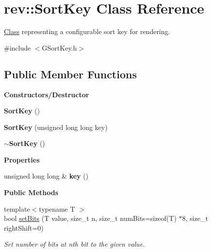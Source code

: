 \hypertarget{classrev_1_1_sort_key}{}\section{rev\+::Sort\+Key Class Reference}
\label{classrev_1_1_sort_key}


\mbox{\hyperlink{struct_class}{Class}} representing a configurable sort key for rendering.  




{\ttfamily \#include $<$G\+Sort\+Key.\+h$>$}

\subsection*{Public Member Functions}
\begin{Indent}\textbf{ Constructors/\+Destructor}\par
\begin{DoxyCompactItemize}
\item 
\mbox{\label{classrev_1_1_sort_key_a20b5f42704bb257a82393624b1993867}} 
{\bfseries Sort\+Key} ()
\item 
\mbox{\label{classrev_1_1_sort_key_a4cd950be7ce999b010495cff11b24c03}} 
{\bfseries Sort\+Key} (unsigned long long key)
\item 
\mbox{\label{classrev_1_1_sort_key_af63c335729ea244f4d4961b840f24612}} 
{\bfseries $\sim$\+Sort\+Key} ()
\end{DoxyCompactItemize}
\end{Indent}
\begin{Indent}\textbf{ Properties}\par
\begin{DoxyCompactItemize}
\item 
\mbox{\label{classrev_1_1_sort_key_adc3ce80e773f5451643a4b1f32f3d7b2}} 
unsigned long long \& {\bfseries key} ()
\end{DoxyCompactItemize}
\end{Indent}
\begin{Indent}\textbf{ Public Methods}\par
\begin{DoxyCompactItemize}
\item 
{\footnotesize template$<$typename T $>$ }\\bool \mbox{\hyperlink{classrev_1_1_sort_key_aaeedcc30c3cf8bf5dff4ccc05eb73299}{set\+Bits}} (T value, size\+\_\+t n, size\+\_\+t num\+Bits=sizeof(T) $\ast$8, size\+\_\+t right\+Shift=0)
\begin{DoxyCompactList}\small\item\em Set number of bits at nth bit to the given value. \end{DoxyCompactList}\end{DoxyCompactItemize}
\end{Indent}
